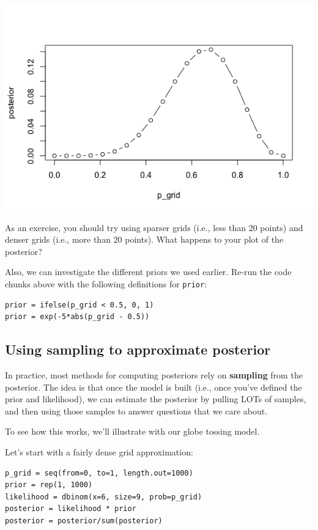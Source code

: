 \documentclass[11pt]{article}
\begin{document}
\includegraphics[width=.9\linewidth]{figures/week9/gridApproximation.png}

As an exercise, you should try using sparser grids (i.e., less than 20 points) and denser grids (i.e., more than 20 points).  What happens to your plot of the posterior?

Also, we can investigate the different priors we used earlier.  Re-run the code chunks above with the following definitions for \texttt{prior}:

\begin{verbatim}
prior = ifelse(p_grid < 0.5, 0, 1)
prior = exp(-5*abs(p_grid - 0.5))
\end{verbatim}

\subsection*{Using sampling to approximate posterior}
\label{sec-2-2}

In practice, most methods for computing posteriors rely on \textbf{sampling} from the posterior.  The idea is that once the model is built (i.e., once you've defined the prior and likelihood), we can estimate the posterior by pulling LOTs of samples, and then using those samples to answer questions that we care about.

To see how this works, we'll illustrate with our globe tossing model.

Let's start with a fairly dense grid approximation:

\begin{verbatim}
p_grid = seq(from=0, to=1, length.out=1000)
prior = rep(1, 1000)
likelihood = dbinom(x=6, size=9, prob=p_grid)
posterior = likelihood * prior
posterior = posterior/sum(posterior)
\end{verbatim}
\end{document}
